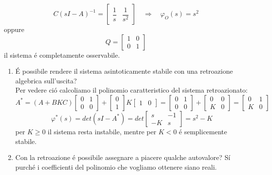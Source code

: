 \documentclass[../main.tex]{subfiles}
\begin{document}
\begin{mdframed}[style=Exercise]
\begin{Exercise}[title={Retroazione algebrica sull'uscita}, difficulty=1]
\begin{itemize}
\[							C(sI-A)^{-1} = 
							\begin{bmatrix}
								\dfrac{1}{s} & \dfrac{1}{s^2}
							\end{bmatrix}
							\quad\Rightarrow\quad \varphi_O(s) = s^2
						\]
						oppure
						\[
							Q =
							\begin{bmatrix}
								1 & 0\\
								0 & 1
							\end{bmatrix}
						\]
						il sistema \'e completamente osservabile.
				\end{itemize}
				\begin{enumerate}
					\item 
						\'E possibile rendere il sistema asintoticamente stabile con una retroazione algebrica sull'uscita?\\
						Per vedere ci\'o calcoliamo il polinomio caratteristico del sistema retroazionato:
						\[
							A^{*}=(A+BKC)
							\begin{bmatrix}
								0 & 1\\
								0 & 0
							\end{bmatrix} +
							\begin{bmatrix}
								0\\
								1
							\end{bmatrix} K
							\begin{bmatrix}
								1 & 0
							\end{bmatrix} =
							\begin{bmatrix}
								0 & 1\\
								0 & 0
							\end{bmatrix} +
							\begin{bmatrix}
								0 & 0\\
								K & 0
							\end{bmatrix} =
							\begin{bmatrix}
								0 & 1\\
								K & 0
							\end{bmatrix}
						\]
						\[
							\varphi^{*}(s) = det(sI-A^{*}) = det
							\begin{bmatrix}
								s & -1\\
								-K & s
							\end{bmatrix} = s^2 - K
						\]
						per $ K \geq 0 $ il sistema resta instabile, mentre per $ K < 0 $ \'e semplicemente stabile.
					\item 
						Con la retroazione \'e possibile assegnare a piacere qualche autovalore?
						S\'i purch\'e i coefficienti del polinomio che vogliamo ottenere siano reali.
				\end{enumerate}
			\end{Exercise}
		\end{mdframed}
	
\end{document}
